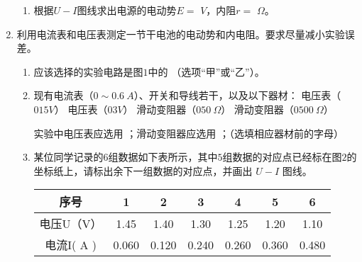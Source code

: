 \begin{enumerate}[leftmargin=0em]
\begin{enumerate}
\item 
根据$ U-I $图线求出电源的电动势$ E= $  
$ V $，内阻$ r= $  
$ \Omega $。




\end{enumerate}




\newpage
\item 
{}
利用电流表和电压表测定一节干电池的电动势和内电阻。要求尽量减小实验误差。
\begin{enumerate}
\renewcommand{\labelenumi}{\arabic{enumi}.}
\item
应该选择的实验电路是图$ 1 $中的  
（选项“甲”或“乙”）。
\begin{figure}[h!]
\centering

\end{figure}

\item 
现有电流表（$ 0\sim 0.6\ A $）、开关和导线若干，以及以下器材：
\fourchoices
{电压表（$ 015V $）}
{电压表（$ 03V $）}
{滑动变阻器（$ 050 \ \Omega $）}
{滑动变阻器（$ 0500 \ \Omega $）}

实验中电压表应选用  
；滑动变阻器应选用  
；（选填相应器材前的字母）
\item 
某位同学记录的$ 6 $组数据如下表所示，其中$ 5 $组数据的对应点已经标在图$ 2 $的坐标纸上，请标出余下一组数据的对应点，并画出 $ U-I $ 图线。
\begin{table}[h!]
\centering 
\begin{tabular}{|c|c|c|c|c|c|c|}
\hline 
序号 & 1 & 2 & 3 & 4 & 5 & 6
 \\
\hline
电压U（V） & 1.45 & 1.40 & 1.30 & 1.25 & 1.20 & 1.10
 \\
\hline
电流I( A ) & 0.060 & 0.120 & 0.240 & 0.260 & 0.360 & 0.480\\ 
\hline 
\end{tabular} \qquad 
 
\end{table} 



\end{enumerate}
\end{enumerate}
